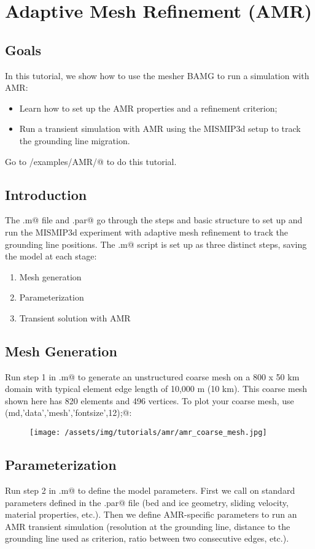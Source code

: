 \section{Adaptive Mesh Refinement (AMR)}
\subsection{Goals} %
In this tutorial, we show how to use the mesher BAMG to run a simulation with AMR:
\begin{itemize}
	\item Learn how to set up the AMR properties and a refinement criterion;
	\item Run a transient simulation with AMR using the MISMIP3d setup to track the grounding line migration.
\end{itemize} 

Go to \verb@trunk/examples/AMR/@ to do this tutorial.
\subsection{Introduction}
The \verb@runme.m@ file and \verb@mismip.par@ go through the steps and basic structure to set up and run the MISMIP3d experiment with adaptive mesh refinement to track the grounding line positions. The \verb@runme.m@ script is set up as three distinct steps, saving the model at each stage:
\begin{enumerate}
	\item Mesh generation
	\item Parameterization
	\item Transient solution with AMR
\end{enumerate}

\subsection{Mesh Generation}
Run step 1 in \verb@runme.m@ to generate an unstructured coarse mesh on a 800 x 50 km domain with typical element edge length of 10,000 m (10 km).  This coarse mesh shown here has 820 elements and 496 vertices. To plot your coarse mesh, use \verb@plotmodel(md,'data','mesh','fontsize',12);@:
\begin{figure}[H]
	\begin{center}
		\texttt{[image: /assets/img/tutorials/amr/amr\_coarse\_mesh.jpg]}
	\end{center}
\end{figure}

\subsection{Parameterization}
Run step 2 in \verb@runme.m@ to define the model parameters. First we call on standard parameters defined in the \verb@mismip.par@ file (bed and ice geometry, sliding velocity, material properties, etc.). Then we define AMR-specific parameters to run an AMR transient simulation (resolution at the grounding line, distance to the grounding line used as criterion, ratio between two consecutive edges, etc.).

